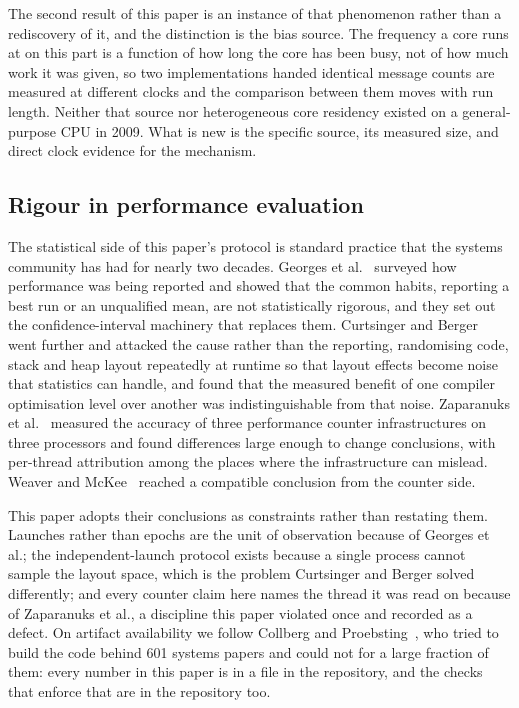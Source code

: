 \documentclass[conference]{IEEEtran}
\begin{document}
The second result of this paper is an instance of that phenomenon rather than a
rediscovery of it, and the distinction is the bias source. The frequency a core
runs at on this part is a function of how long the core has been busy, not of
how much work it was given, so two implementations handed identical message
counts are measured at different clocks and the comparison between them moves
with run length. Neither that source nor heterogeneous core residency existed
on a general-purpose CPU in 2009. What is new is the specific source, its
measured size, and direct clock evidence for the mechanism.

\subsection{Rigour in performance evaluation}

The statistical side of this paper's protocol is standard practice that the
systems community has had for nearly two decades. Georges et
al.~\cite{georges2007statistically} surveyed how performance was being reported
and showed that the common habits, reporting a best run or an unqualified mean,
are not statistically rigorous, and they set out the confidence-interval
machinery that replaces them. Curtsinger and
Berger~\cite{curtsinger2013stabilizer} went further and attacked the cause
rather than the reporting, randomising code, stack and heap layout repeatedly at
runtime so that layout effects become noise that statistics can handle, and
found that the measured benefit of one compiler optimisation level over another
was indistinguishable from that noise. Zaparanuks et
al.~\cite{zaparanuks2009accuracy} measured the accuracy of three performance
counter infrastructures on three processors and found differences large enough
to change conclusions, with per-thread attribution among the places where the
infrastructure can mislead. Weaver and McKee~\cite{weaver2008trusted} reached a
compatible conclusion from the counter side.

This paper adopts their conclusions as constraints rather than restating them.
Launches rather than epochs are the unit of observation because of Georges et
al.; the independent-launch protocol exists because a single process cannot
sample the layout space, which is the problem Curtsinger and Berger solved
differently; and every counter claim here names the thread it was read on
because of Zaparanuks et al., a discipline this paper violated once and recorded
as a defect. On artifact availability we follow Collberg and
Proebsting~\cite{collberg2016repeatability}, who tried to build the code behind
601 systems papers and could not for a large fraction of them: every number in
this paper is in a file in the repository, and the checks that enforce that are
in the repository too.
\end{document}
